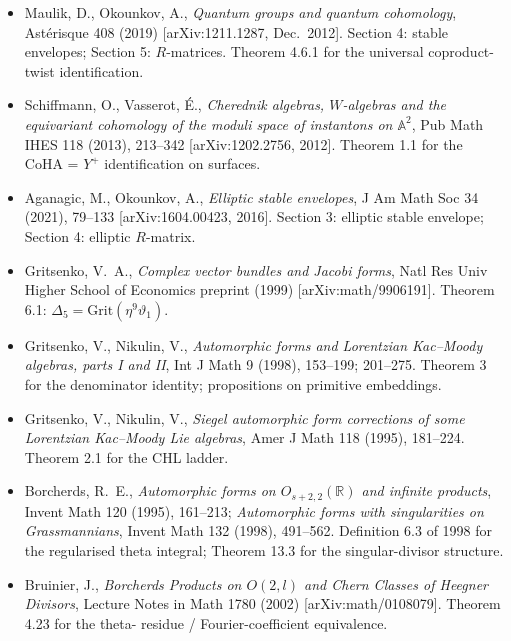 \begin{itemize}
\item Maulik, D., Okounkov, A., \emph{Quantum groups and quantum
      cohomology}, Ast\'erisque 408 (2019) [arXiv:1211.1287,
      Dec.\ 2012].  Section 4: stable envelopes; Section 5:
      $R$-matrices.  Theorem 4.6.1 for the universal coproduct-twist
      identification.

\item Schiffmann, O., Vasserot, \'E., \emph{Cherednik algebras,
      $W$-algebras and the equivariant cohomology of the moduli
      space of instantons on $\mathbb A^{2}$}, Pub Math IHES 118
      (2013), 213--342 [arXiv:1202.2756, 2012].  Theorem 1.1 for
      the CoHA = $Y^{+}$ identification on surfaces.

\item Aganagic, M., Okounkov, A., \emph{Elliptic stable envelopes},
      J Am Math Soc 34 (2021), 79--133 [arXiv:1604.00423, 2016].
      Section 3: elliptic stable envelope; Section 4: elliptic
      $R$-matrix.

\item Gritsenko, V.\ A., \emph{Complex vector bundles and Jacobi
      forms}, Natl Res Univ Higher School of Economics preprint
      (1999) [arXiv:math/9906191].  Theorem 6.1:
      $\Delta_{5} = \mathrm{Grit}(\eta^{9}\vartheta_{1})$.

\item Gritsenko, V., Nikulin, V., \emph{Automorphic forms and Lorentzian
      Kac--Moody algebras, parts I and II}, Int J Math 9 (1998),
      153--199; 201--275.  Theorem 3 for the denominator identity;
      propositions on primitive embeddings.

\item Gritsenko, V., Nikulin, V., \emph{Siegel automorphic form
      corrections of some Lorentzian Kac--Moody Lie algebras},
      Amer J Math 118 (1995), 181--224. Theorem 2.1 for the CHL
      ladder.

\item Borcherds, R.\ E., \emph{Automorphic forms on $O_{s+2,2}
      (\mathbb R)$ and infinite products}, Invent Math 120 (1995),
      161--213; \emph{Automorphic forms with singularities on
      Grassmannians}, Invent Math 132 (1998), 491--562.  Definition
      6.3 of 1998 for the regularised theta integral; Theorem 13.3
      for the singular-divisor structure.

\item Bruinier, J., \emph{Borcherds Products on $O(2, l)$ and Chern
      Classes of Heegner Divisors}, Lecture Notes in Math 1780
      (2002) [arXiv:math/0108079].  Theorem 4.23 for the theta-
      residue / Fourier-coefficient equivalence.


\end{itemize}
